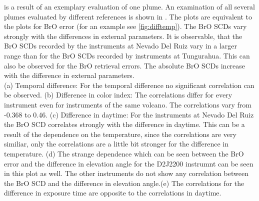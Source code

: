 \documentclass  [
  paper    = a4,
  BCOR     = 10mm,
  twoside,
  fontsize = 12pt,
  fleqn,
  toc      = bibnumbered,
  toc      = listofnumbered,
  numbers  = noendperiod,
  headings = normal,
  listof   = leveldown,
  version  = 3.03
]                                       {scrreprt}
\begin{document}
	 is a result of an exemplary evaluation of one plume. An examination of all several plumes evaluated by different references is shown in . The plots are equivalent to the plots for BrO error (for an example see \cref{fig:difftemp}). The BrO SCDs vary strongly with the differences in external parameters. It is observable, that the BrO SCDs recorded by the instruments at Nevado Del Ruiz vary in a larger range than for the BrO SCDs recorded by instruments at Tungurahua. This can also be observed for the BrO retrieval errors. The absolute BrO SCDs increase with the difference in external parameters.\\
	 (a) Temporal difference: For the temporal difference no significant correlation can be observed. (b) Difference in color index: The correlations differ for every instrument even for instruments of the same volcano. The correlations vary from -0.368 to 0.46. (c) Difference in daytime: For the instruments at Nevado Del Ruiz the BrO SCD correlates strongly with the difference in daytime. This can be a result of the dependence on the temperature, since the correlations are very similiar, only the correlations are a little bit stronger for the difference in temperature. (d) The strange dependence which can be seen between the BrO error and the difference in elevation angle for the D2J2200 instrumnt can be seen in this plot as well. The other instruments do not show any correlation between the BrO SCD and the difference in elevation angle.(e) The correlations for the difference in exposure time are opposite to the correlations in daytime. 
\end{document}

